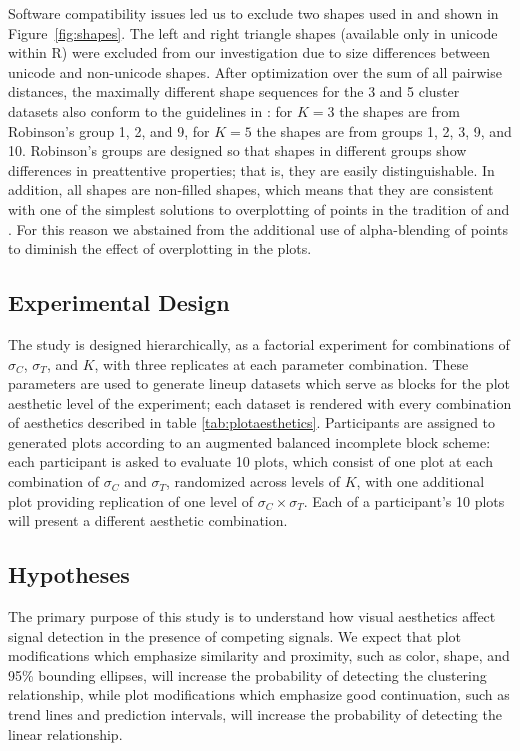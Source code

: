 \documentclass[12pt]{article}\usepackage[]{graphicx}\usepackage[]{color}
\begin{document}
Software compatibility issues led us to exclude two shapes used in \citet{heer:2014} and shown in Figure~\ref{fig:shapes}. The left and right triangle shapes (available only in unicode within R) were excluded from our investigation due to size differences between unicode and non-unicode shapes. After optimization over the sum of all pairwise distances, the maximally different shape sequences for the 3 and 5 cluster datasets also conform to the guidelines in \citet{robinson:03}: for $K=3$ the shapes are from Robinson's group 1, 2, and 9, for $K=5$ the shapes are from groups 1, 2, 3, 9, and 10. Robinson's groups are designed so that shapes in different groups show differences in preattentive properties; that is, they are easily distinguishable. In addition, all shapes are non-filled shapes, which means that they are consistent with one of the simplest solutions to overplotting of points in the tradition of \citet{tukey, cleveland:85} and \citet{few}. For this reason we abstained from the additional use of alpha-blending of points to diminish the effect of overplotting in the plots.




\subsection{Experimental Design}
The study is designed hierarchically, as a factorial experiment for combinations of $\sigma_C$, $\sigma_T$, and $K$, with three replicates at each parameter combination. These parameters are used to generate lineup datasets which serve as blocks for the plot aesthetic level of the experiment; each dataset is rendered with every combination of aesthetics described in table \ref{tab:plotaesthetics}. Participants are assigned to generated plots according to an augmented balanced incomplete block scheme: each participant is asked to evaluate 10 plots, which consist of one plot at each combination of $\sigma_C$ and $\sigma_T$, randomized across levels of $K$, with one additional plot providing replication of one level of $\sigma_C\times\sigma_T$. Each of a participant's 10 plots will present a different aesthetic combination.

\subsection{Hypotheses}
The primary purpose of this study is to understand how visual aesthetics affect signal detection in the presence of competing signals. We expect that plot modifications which emphasize similarity and proximity, such as color, shape, and 95\% bounding ellipses, will increase the probability of detecting the clustering relationship, while plot modifications which emphasize good continuation, such as trend lines and prediction intervals, will increase the probability of detecting the linear relationship. 
\end{document}
